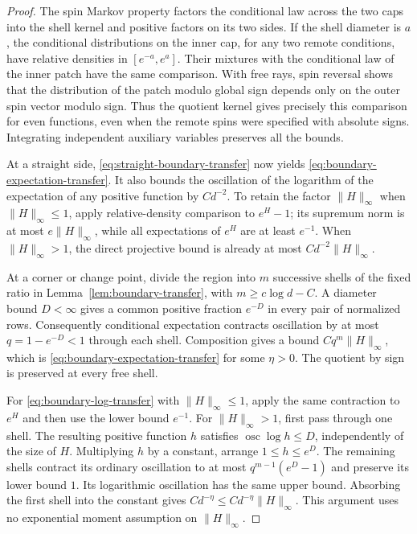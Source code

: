 \begin{proof}
The spin Markov property factors the conditional law across the two
caps into the shell kernel and positive factors on its two sides.
If the shell diameter is $a$, the conditional distributions on the
inner cap, for any two remote conditions, have relative densities in
$[e^{-a},e^a]$. Their mixtures with the conditional law of the inner
patch have the same comparison. With free rays, spin reversal shows
that the distribution of the patch modulo global sign depends only
on the outer spin vector modulo sign. Thus the quotient kernel gives
precisely this comparison for even functions, even when the remote
spins were specified with absolute signs. Integrating independent
auxiliary variables preserves all the bounds.

At a straight side, \eqref{eq:straight-boundary-transfer} now yields
\eqref{eq:boundary-expectation-transfer}. It also bounds the
oscillation of the logarithm of the expectation of any positive
function by $Cd^{-2}$. To retain the factor $\|H\|_\infty$ when
$\|H\|_\infty\le1$, apply relative-density comparison to $e^H-1$;
its supremum norm is at most $e\|H\|_\infty$, while all expectations
of $e^H$ are at least $e^{-1}$. When $\|H\|_\infty>1$, the direct
projective bound is already at most $Cd^{-2}\|H\|_\infty$.

At a corner or change point, divide the region into $m$ successive
shells of the fixed ratio in Lemma~\ref{lem:boundary-transfer}, with
$m\ge c\log d-C$. A diameter bound $D<\infty$ gives a common
positive fraction $e^{-D}$ in every pair of normalized rows.
Consequently conditional expectation contracts oscillation by at most
$q=1-e^{-D}<1$ through each shell. Composition gives a bound
$Cq^m\|H\|_\infty$, which is \eqref{eq:boundary-expectation-transfer}
for some $\eta>0$. The quotient by sign is preserved at every free
shell.

For \eqref{eq:boundary-log-transfer} with $\|H\|_\infty\le1$,
apply the same contraction to $e^H$ and then use the lower bound
$e^{-1}$. For $\|H\|_\infty>1$, first pass through one shell.
The resulting positive function $h$ satisfies
$\mathop{\mathrm{osc}}\log h\le D$, independently of the size of
$H$. Multiplying $h$ by a constant, arrange $1\le h\le e^D$.
The remaining shells contract its ordinary oscillation to at most
$q^{m-1}(e^D-1)$ and preserve its lower bound $1$. Its logarithmic
oscillation has the same upper bound. Absorbing the first shell into
the constant gives $Cd^{-\eta}\le Cd^{-\eta}\|H\|_\infty$.
This argument uses no exponential moment assumption on $\|H\|_\infty$.
\end{proof}

